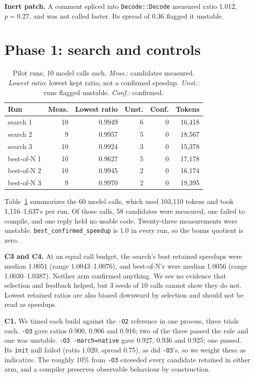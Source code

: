 \documentclass[10pt,twocolumn]{article}
\begin{document}
\textbf{Inert patch.} A comment spliced into \texttt{Decode::Decode} measured ratio
1.012, $p=0.27$, and was not called faster. Its spread of 0.36 flagged it unstable.

\section{Phase 1: search and controls}
\begin{table}[t]
\centering\footnotesize
\begin{tabular}{@{}lrrrrr@{}}
\toprule
Run & Meas. & Lowest ratio & Unst. & Conf. & Tokens\\
\midrule
search 1 & 10 & 0.9949 & 6 & 0 & 16,418\\
search 2 & 9 & 0.9957 & 5 & 0 & 18,567\\
search 3 & 10 & 0.9924 & 3 & 0 & 15,378\\
best-of-N 1 & 10 & 0.9627 & 5 & 0 & 17,178\\
best-of-N 2 & 10 & 0.9945 & 2 & 0 & 16,174\\
best-of-N 3 & 9 & 0.9970 & 2 & 0 & 19,395\\
\bottomrule
\end{tabular}
\caption{Pilot runs, 10 model calls each. \emph{Meas.}: candidates measured.
\emph{Lowest ratio}: lowest kept ratio, not a confirmed speedup. \emph{Unst.}: runs
flagged unstable. \emph{Conf.}: confirmed.}
\label{tab:runs}
\end{table}

Table~\ref{tab:runs} summarizes the 60 model calls, which used 103,110 tokens
and took 1,116--1,637\,s per run. Of those calls, 58 candidates were measured, one
failed to compile, and one reply held no usable code. Twenty-three measurements were
unstable. \texttt{best\_confirmed\_speedup} is 1.0 in every run, so the bonus quotient
is zero.

\textbf{C3 and C4.} At an equal call budget, the search's best retained speedups
were median 1.0051 (range 1.0043--1.0076), and best-of-N's were median 1.0056 (range
1.0030--1.0387). Neither arm confirmed anything. We see no evidence that selection
and feedback helped, but 3 seeds of 10 calls cannot show they do not. Lowest retained
ratios are also biased downward by selection and should not be read as speedups.

\textbf{C1.} We timed each build against the \texttt{-O2} reference in one process,
three trials each. \texttt{-O3} gave ratios 0.900, 0.906 and 0.916; two of the three
passed the rule and one was unstable. \texttt{-O3 -march=native} gave 0.927, 0.936
and 0.925; one passed. Its \texttt{init} null failed (ratio 1.020, spread 0.75), as
did \texttt{-O3}'s, so we weight these as indicative. The roughly 10\% from
\texttt{-O3} exceeded every candidate retained in either arm, and a compiler
preserves observable behaviour by construction.
\end{document}
